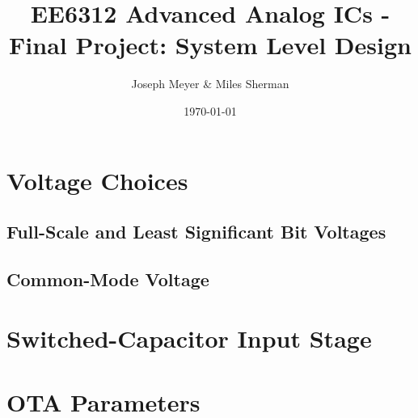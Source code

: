 \documentclass{article}
\begin{document}
\title{EE6312 Advanced Analog ICs - Final Project: System Level Design}
\author{Joseph Meyer \& Miles Sherman}
\date{\today}
\maketitle

\section{Voltage Choices}
\subsection{Full-Scale and Least Significant Bit Voltages}

\subsection{Common-Mode Voltage}

\section{Switched-Capacitor Input Stage}

\section{OTA Parameters}



%
\end{document}
